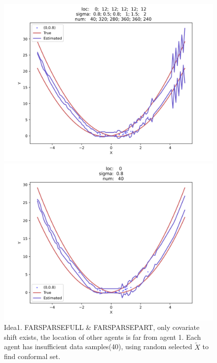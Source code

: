 \documentclass[12pt, a4paper, oneside]{article}
\begin{document}
    \begin{figure}[htbp]
        \centering
        \begin{minipage}{0.495\linewidth}
            \centering
            \includegraphics[width=0.98\linewidth]{fig/Ex1_1/FARSPARSEFULL.png}
        \end{minipage}
        \begin{minipage}{0.495\linewidth}
            \centering
            \includegraphics[width=0.98\linewidth]{fig/Ex1_1/FARSPARSEPART.png}
        \end{minipage}
        \caption{Idea1. FARSPARSEFULL \& FARSPARSEPART, only covariate shift exists, the location of other agents is far from agent 1. Each agent has insufficient data samples(40), using random selected $\tilde{X}$ to find conformal set.}
        \label{Fig4}
    \end{figure}
\end{document}

